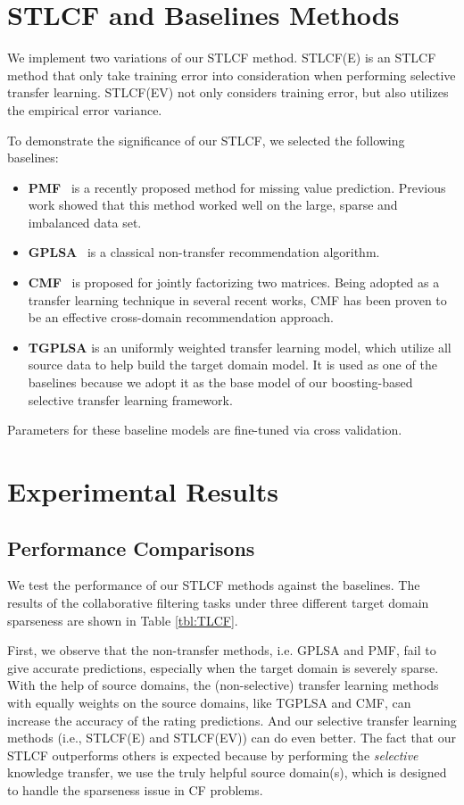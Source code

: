 \hspace{0.1in}
\section{STLCF and Baselines Methods}
We implement two variations of our STLCF method.
STLCF(E) is an STLCF method that only take training error into consideration when performing selective transfer learning.
STLCF(EV) not only considers training error, but also utilizes the empirical error variance.

To demonstrate the significance of our STLCF, we selected the following baselines:
\begin{itemize}
\item {\bf PMF}~\cite{/nips/SalakhutdinovM07} is a recently proposed method for missing value prediction. Previous work showed that this method worked well on the large, sparse and imbalanced data set.
\item {\bf GPLSA}~\cite{DBLP:conf/sigir/Hofmann03} is a classical non-transfer recommendation algorithm.
\item {\bf CMF}~\cite{/kdd/SinghG08} is proposed for jointly factorizing two matrices. Being adopted as a transfer learning technique in several recent works, CMF has been proven to be an effective cross-domain recommendation approach.
\item {\bf TGPLSA} is an uniformly weighted transfer learning model, which utilize all source data to help build the target domain model. It is used as one of the baselines because we adopt it as the base model of our boosting-based selective transfer learning framework.
\end{itemize}
Parameters for these baseline models are fine-tuned via cross validation.

\hspace{0.1in}
\section{Experimental Results}
\subsection{Performance Comparisons}
We test the performance of our STLCF methods against the baselines.
The results of the collaborative filtering tasks under three different target domain sparseness are shown in Table \ref{tbl:TLCF}.

First, we observe that the non-transfer methods, i.e. GPLSA and PMF, fail to give accurate predictions, especially when the target domain is severely sparse.
With the help of source domains, the (non-selective) transfer learning methods with equally weights on the source domains, like TGPLSA and CMF, can increase the accuracy of the rating predictions. And our selective transfer learning methods (i.e., STLCF(E) and STLCF(EV)) can do even better.
The fact that our STLCF outperforms others is expected because by performing the {\em selective} knowledge transfer, we use the truly helpful source domain(s), which is designed to handle the sparseness issue in CF problems.

